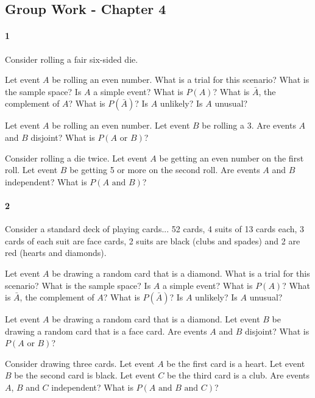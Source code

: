 \documentclass{article}
\begin{document}
\begin{flushleft}
\section*{Group Work - Chapter 4}
\paragraph{1} Consider rolling a fair six-sided die.
\begin{enumalpha}
\item Let event $A$ be rolling an even number. What is a trial for this scenario? What is the sample space? Is $A$ a simple event? What is $P(A)$? What is $\bar A$, the complement of $A$? What is $P(\bar A)$? Is $A$ unlikely? Is $A$ unusual?
\vspace{2.5in}
\item Let event $A$ be rolling an even number. Let event $B$ be rolling a 3. Are events $A$ and $B$ disjoint? What is $P(A \text{ or } B)$?
\vspace{2.5in}
\item Consider rolling a die twice. Let event $A$ be getting an even number on the first roll. Let event $B$ be getting 5 or more on the second roll. Are events $A$ and $B$ independent? What is $P(A \text { and } B)$?
\end{enumalpha}

\newpage
\paragraph{2} Consider a standard deck of playing cards... 52 cards, 4 suits of 13 cards each, 3 cards of each suit are face cards, 2 suits are black (clubs and spades) and 2 are red (hearts and diamonds).
\begin{enumalpha}
\item Let event $A$ be drawing a random card that is a diamond. What is a trial for this scenario? What is the sample space? Is $A$ a simple event? What is $P(A)$? What is $\bar A$, the complement of $A$? What is $P(\bar A)$? Is $A$ unlikely? Is $A$ unusual?
\vspace{2.5in}
\item Let event $A$ be drawing a random card that is a diamond. Let event $B$ be drawing a random card that is a face card. Are events $A$ and $B$ disjoint? What is $P(A \text{ or } B)$?
\vspace{2.5in}
\item Consider drawing three cards. Let event $A$ be the first card is a heart. Let event $B$ be the second card is black. Let event $C$ be the third card is a club. Are events $A$, $B$ and $C$ independent? What is $P(A \text { and } B \text { and } C)$?


\end{enumalpha}
\end{flushleft}
\end{document}
